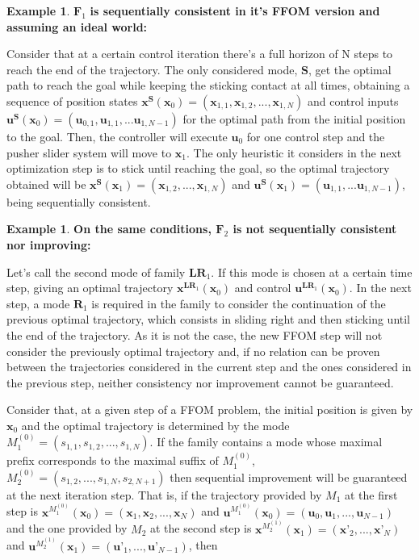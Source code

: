 \documentclass[12,twoside]{TFG-GM}
\theoremstyle{definition}
\newtheorem{example}[theorem]{Example}
\theoremstyle{remark}
\begin{document}
\begin{example} \label{ex:f1consistent} $\textbf{F}_1$ \textbf{is sequentially consistent in it's FFOM version and assuming an ideal world:}

Consider that at a certain control iteration there's a full horizon of N steps to reach the end of the trajectory. The only considered mode, $\textbf{S}$, get the optimal path to reach the goal while keeping the sticking contact at all times, obtaining a sequence of position states $\textbf{x}^{\textbf{S}}(\textbf{x}_0) = (\textbf{x}_{1,1}, \textbf{x}_{1,2}, ..., \textbf{x}_{1,N})$ and control inputs $\textbf{u}^{\textbf{S}}(\textbf{x}_0) = (\textbf{u}_{0,1}, \textbf{u}_{1,1}, ... \textbf{u}_{1,N-1})$ for the optimal path from the initial position to the goal. Then, the controller will execute $\textbf{u}_0$ for one control step and the pusher slider system will move to $\textbf{x}_1$. The only heuristic it considers in the next optimization step is to stick until reaching the goal, so the optimal trajectory obtained will be $\textbf{x}^{\textbf{S}}(\textbf{x}_1) = (\textbf{x}_{1,2}, ..., \textbf{x}_{1,N})$ and $\textbf{u}^{\textbf{S}}(\textbf{x}_1) = (\textbf{u}_{1,1}, ... \textbf{u}_{1,N-1})$, being sequentially consistent.
\end{example}
\begin{example} \label{ex:f2notconsistent} \textbf{On the same conditions, $\textbf{F}_2$ is not sequentially consistent nor improving:}

Let's call the second mode of family $\textbf{LR}_1$. If this mode is chosen at a certain time step, giving an optimal trajectory $\textbf{x}^{\textbf{LR}_1}(\textbf{x}_0)$ and control $\textbf{u}^{\textbf{LR}_1}(\textbf{x}_0)$. In the next step, a mode $\textbf{R}_1$ is required in the family to consider the continuation of the previous optimal trajectory, which consists in sliding right and then sticking until the end of the trajectory. As it is not the case, the new FFOM step will not consider the previously optimal trajectory and, if no relation can be proven between the trajectories considered in the current step and the ones considered in the previous step, neither consistency nor improvement cannot be guaranteed.
\end{example}


Consider that, at a given step of a FFOM problem, the initial position is given by $\textbf{x}_0$ and the optimal trajectory is determined by the mode $M_1^{(0)} = (s_{1,1}, s_{1,2}, ..., s_{1,N})$. If the family contains a mode whose maximal prefix corresponds to the maximal suffix of $M_1^{(0)}$, $M_2^{(0)} = (s_{1,2}, ..., s_{1,N}, s_{2,N+1} )$ then sequential improvement will be guaranteed at the next iteration step. That is, if the trajectory provided by $M_1$ at the first step is $\textbf{x}^{M_1^{(0)}}(\textbf{x}_0) = (\textbf{x}_1, \textbf{x}_2, ..., \textbf{x}_N)$ and $\textbf{u}^{M_1^{(0)}}(\textbf{x}_0) = (\textbf{u}_0, \textbf{u}_1, ..., \textbf{u}_{N-1})$ and the one provided by $M_2$ at the second step is $\textbf{x}^{M_2^{(1)}}(\textbf{x}_1) = (\textbf{x'}_2, ..., \textbf{x'}_N)$ and $\textbf{u}^{M_2^{(1)}}(\textbf{x}_1) = (\textbf{u'}_1, ..., \textbf{u'}_{N-1})$, then
\end{document}
